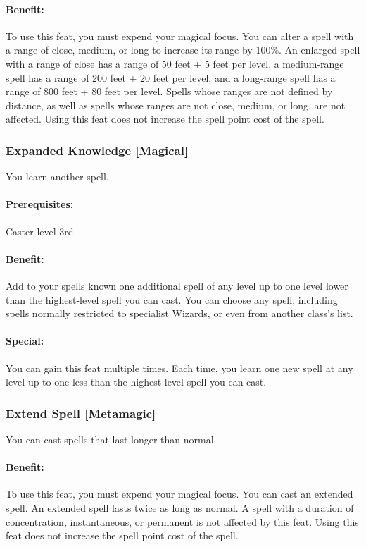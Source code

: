\paragraph{Benefit:} To use this feat, you must expend your magical focus. 
You can alter a spell with a range of close, medium, or long to increase its range by 100\%. 
An enlarged spell with a range of close has a range of 50 feet + 5 feet per level, 
a medium-range spell has a range of 200 feet + 20 feet per level, 
and a long-range spell has a range of 800 feet + 80 feet per level.
Spells whose ranges are not defined by distance, as well as spells whose ranges are not close, medium, or long, are not affected.
Using this feat does not increase the spell point cost of the spell.

\subsubsection[Expanded Knowledge]{Expanded Knowledge [Magical]}
\label{Feat:ExpandedKnowledge}
You learn another spell.

\paragraph{Prerequisites:} Caster level 3rd.

\paragraph{Benefit:} Add to your spells known one additional spell of any level up to one level lower than the highest-level spell you can cast. 
You can choose any spell, including spells normally restricted to specialist Wizards, or even from another class's list.

\paragraph{Special:} You can gain this feat multiple times. Each time, you learn one new spell at any level up to one less than the highest-level spell you can cast.

\subsubsection[Extend Spell]{Extend Spell [Metamagic]}
\label{Feat:ExtendSpell}
You can cast spells that last longer than normal.

\paragraph{Benefit:} To use this feat, you must expend your magical focus.
You can cast an extended spell. An extended spell lasts twice as long as normal. 
A spell with a duration of concentration, instantaneous, or permanent is not affected by this feat.
Using this feat does not increase the spell point cost of the spell.

